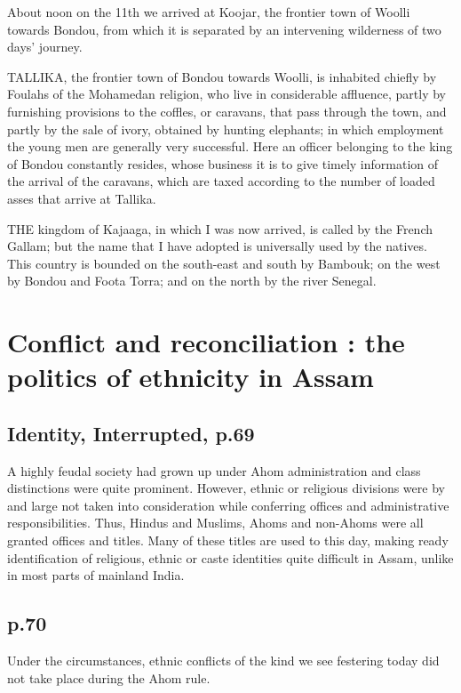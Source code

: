 \documentclass[12pt]{article}
\begin{document}
About noon on the 11th we arrived at Koojar, the frontier town of Woolli towards
Bondou, from which it is separated by an intervening wilderness of two days’
journey.

TALLIKA, the frontier town of Bondou towards Woolli, is inhabited chiefly by
Foulahs of the Mohamedan religion, who live in considerable affluence, partly by
furnishing provisions to the coffles, or caravans, that pass through the town,
and partly by the sale of ivory, obtained by hunting elephants; in which
employment the young men are generally very successful. Here an officer
belonging to the king of Bondou constantly resides, whose business it is to give
timely information of the arrival of the caravans, which are taxed according to
the number of loaded asses that arrive at Tallika.

THE kingdom of Kajaaga, in which I was now arrived, is called by the French
Gallam; but the name that I have adopted is universally used by the natives.
This country is bounded on the south-east and south by Bambouk; on the west by
Bondou and Foota Torra; and on the north by the river Senegal.

\section{Conflict and reconciliation : the politics of ethnicity in Assam
\citep{Goswami2014}}

\subsection{Identity, Interrupted, p.69}

A highly feudal society had grown up under Ahom administration and class
distinctions were quite prominent. However, ethnic or religious divisions were
by and large not taken into consideration while conferring offices and
administrative responsibilities. Thus, Hindus and Muslims, Ahoms and non-Ahoms
were all granted offices and titles. Many of these titles are used to this day,
making ready identification of religious, ethnic or caste identities quite
difficult in Assam, unlike in most parts of mainland India.

\subsection{p.70}

Under the circumstances, ethnic conflicts of the kind we see festering today
did not take place during the Ahom rule.
\end{document}
